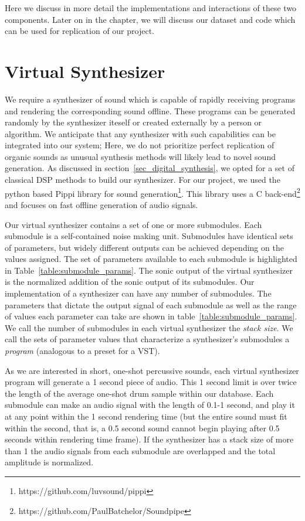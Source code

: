 \documentclass[\main/thesis.tex]{subfiles}
\begin{document}
Here we discuss in more detail the implementations and interactions of these two components. Later on in the chapter, we will discuss our dataset and code which can be used for replication of our project. 
\section{Virtual Synthesizer}
\label{vs}
We require a synthesizer of sound which is capable of rapidly receiving programs and rendering the corresponding sound offline. These programs can be generated randomly by the synthesizer iteself or created externally by a person or algorithm.  We anticipate that any synthesizer with such capabilities can be integrated into our system; Here, we do not prioritize perfect replication of organic sounds as unusual synthesis methods will likely lead to novel sound generation. As discussed in section~\ref{sec_digital_synthesis}, we opted for a set of classical DSP methods to build our synthesizer. For our project, we used the python based Pippi library for sound generation\footnote{https://github.com/luvsound/pippi}. This library uses a C back-end\footnote{https://github.com/PaulBatchelor/Soundpipe} and focuses on fast offline generation of audio signals.

Our virtual synthesizer contains a set of one or more submodules. Each submodule is a self-contained noise making unit. Submodules have identical sets of parameters, but widely different outputs can be achieved depending on the values assigned. The set of parameters available to each submodule is highlighted in Table~\ref{table:submodule_params}. The sonic output of the virtual synthesizer is the normalized addition of the sonic output of its submodules. Our implementation of a synthesizer can have any number of submodules. The parameters that dictate the output signal of each submodule as well as the range of values each parameter can take are shown in table~\ref{table:submodule_params}. We call the number of submodules in each virtual synthesizer the \textit{stack size}. We call the sets of parameter values that characterize a synthesizer's submodules a \textit{program} (analogous to a preset for a VST).  

As we are interested in short, one-shot percussive sounds, each virtual synthesizer program will generate a 1 second piece of audio. This 1 second limit is over twice the length of the average one-shot drum sample within our database. Each submodule can make an audio signal with the length of 0.1-1 second, and play it at any point within the 1 second rendering time (but the entire sound must fit within the second, that is, a 0.5 second sound cannot begin playing after 0.5 seconds within rendering time frame). If the synthesizer has a stack size of more than 1 the audio signals from each submodule are overlapped and the total amplitude is normalized.
\end{document}
